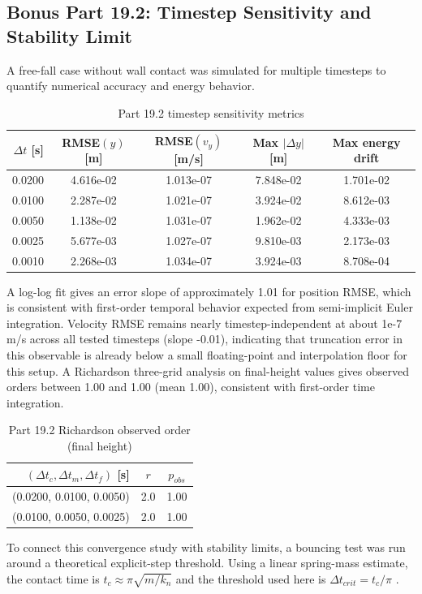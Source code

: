 \subsection{Bonus Part 19.2: Timestep Sensitivity and Stability Limit}
A free-fall case without wall contact was simulated for multiple timesteps to quantify numerical accuracy and energy behavior.
\begin{table}[!t]
\centering
\caption{Part 19.2 timestep sensitivity metrics}
\label{tab:part19-2-timestep}
\begin{tabular}{rcccc}
\toprule
$\Delta t$ [s] & RMSE$(y)$ [m] & RMSE$(v_y)$ [m/s] & Max $|\Delta y|$ [m] & Max energy drift \\
\midrule
0.0200 & 4.616e-02 & 1.013e-07 & 7.848e-02 & 1.701e-02 \\
0.0100 & 2.287e-02 & 1.021e-07 & 3.924e-02 & 8.612e-03 \\
0.0050 & 1.138e-02 & 1.031e-07 & 1.962e-02 & 4.333e-03 \\
0.0025 & 5.677e-03 & 1.027e-07 & 9.810e-03 & 2.173e-03 \\
0.0010 & 2.268e-03 & 1.034e-07 & 3.924e-03 & 8.708e-04 \\
\bottomrule
\end{tabular}
\end{table}
A log-log fit gives an error slope of approximately 1.01 for position RMSE, which is consistent with first-order temporal behavior expected from semi-implicit Euler integration.
Velocity RMSE remains nearly timestep-independent at about 1e-7 m/s across all tested timesteps (slope -0.01), indicating that truncation error in this observable is already below a small floating-point and interpolation floor for this setup.
A Richardson three-grid analysis on final-height values gives observed orders between 1.00 and 1.00 (mean 1.00), consistent with first-order time integration.
\begin{table}[!t]
\centering
\caption{Part 19.2 Richardson observed order (final height)}
\label{tab:part19-2-richardson}
\begin{tabular}{rcc}
\toprule
$(\Delta t_c,\Delta t_m,\Delta t_f)$ [s] & $r$ & $p_{obs}$ \\
\midrule
(0.0200, 0.0100, 0.0050) & 2.0 & 1.00 \\
(0.0100, 0.0050, 0.0025) & 2.0 & 1.00 \\
\bottomrule
\end{tabular}
\end{table}
To connect this convergence study with stability limits, a bouncing test was run around a theoretical explicit-step threshold. Using a linear spring-mass estimate, the contact time is $t_c \approx \pi\sqrt{m/k_n}$ and the threshold used here is $\Delta t_{crit}=t_c/\pi$ \cite{edem_linear_spring,pfc_timestep}.
